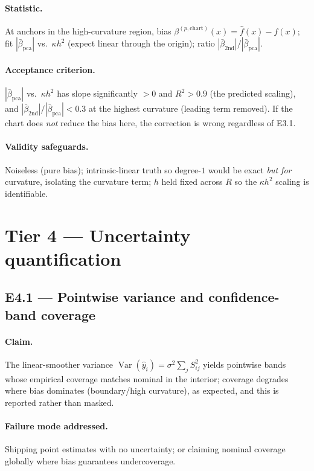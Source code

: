 \documentclass[11pt]{article}
\newcommand{\Var}{\operatorname{Var}}
\begin{document}
\paragraph{Statistic.} At anchors in the high-curvature region, bias
$\beta^{(p,\mathrm{chart})}(x)=\hat f(x)-f(x)$; fit $|\bar\beta_{\mathrm{pca}}|$ vs.\ $\kappa h^2$
(expect linear through the origin); ratio $|\bar\beta_{\mathrm{2nd}}|/|\bar\beta_{\mathrm{pca}}|$.

\paragraph{Acceptance criterion.} $|\bar\beta_{\mathrm{pca}}|$ vs.\ $\kappa h^2$ has slope
significantly $>0$ and $R^2>0.9$ (the predicted scaling), and
$|\bar\beta_{\mathrm{2nd}}|/|\bar\beta_{\mathrm{pca}}|<0.3$ at the highest curvature (leading term
removed). If the chart does \emph{not} reduce the bias here, the correction is wrong regardless of
E3.1.

\paragraph{Validity safeguards.} Noiseless (pure bias); intrinsic-linear truth so degree-$1$ would
be exact \emph{but for} curvature, isolating the curvature term; $h$ held fixed across $R$ so the
$\kappa h^2$ scaling is identifiable.

\section{Tier 4 — Uncertainty quantification}

\subsection{E4.1 — Pointwise variance and confidence-band coverage}

\paragraph{Claim.} The linear-smoother variance $\Var(\hat y_i)=\sigma^2\sum_j S_{ij}^2$ yields
pointwise bands whose empirical coverage matches nominal in the interior; coverage degrades where
bias dominates (boundary/high curvature), as expected, and this is reported rather than masked.

\paragraph{Failure mode addressed.} Shipping point estimates with no uncertainty; or claiming
nominal coverage globally where bias guarantees undercoverage.
\end{document}
